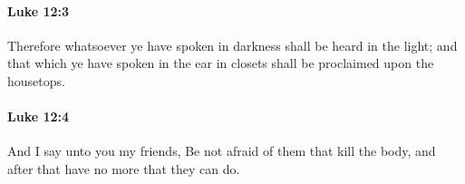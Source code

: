		\paragraph{Luke 12:3} %
			\label{LUKE-12-3}

			Therefore whatsoever ye have spoken in darkness shall be heard in the light; and that which ye have spoken in the ear in closets shall be proclaimed upon the housetops.

			\begin{framed}
			\scriptsize
				\begin{compactdesc}
					\item[SBLG] 
				\end{compactdesc}
			\end{framed}

		\paragraph{Luke 12:4} %
			\label{LUKE-12-4}

			And I say unto you my friends, Be not afraid of them that kill the body, and after that have no more that they can do.

